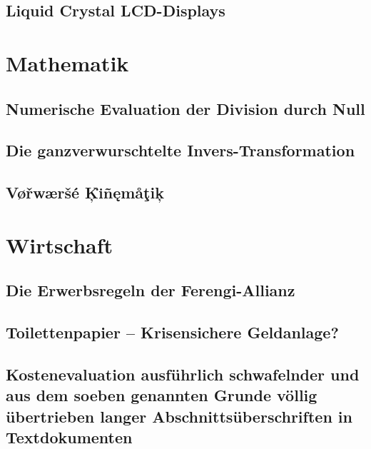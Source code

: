 		\subsection{Liquid Crystal LCD-Displays}
			\blindtext
		
	\section{Mathematik}
		\subsection{Numerische Evaluation der Division durch Null}
			\blindtext
		\subsection{Die ganzverwurschtelte Invers-Transformation}
			\blindtext
		\subsection{V\o{}\v{r}w\ae{}r\v{s}\'{e} \c{K}\"{\i}\~{n}\k{e}m\aa{}\c{t}i\c{k}}
			\blindtext
		
	\section{Wirtschaft}
		\subsection{Die Erwerbsregeln der Ferengi-Allianz}
			\blindtext
			
		\subsection{Toilettenpapier -- Krisensichere Geldanlage?}
			\blindtext
			
		\subsection{Kostenevaluation ausführlich schwafelnder und aus dem soeben genannten Grunde völlig übertrieben langer Abschnittsüberschriften in Textdokumenten}
			\blindtext
			

		